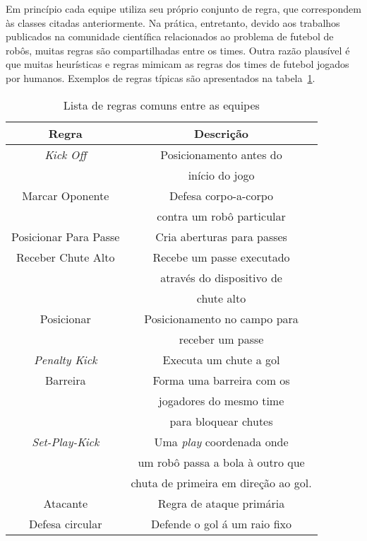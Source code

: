 Em princípio cada equipe utiliza seu próprio conjunto de regra, que correspondem
às classes citadas anteriormente.
Na prática, entretanto, devido aos trabalhos publicados na comunidade científica
relacionados ao problema de futebol de robôs, muitas regras são compartilhadas
entre os times. Outra razão plausível é que muitas heurísticas e regras mimicam
as regras dos times de futebol jogados por humanos. Exemplos de regras típicas são
apresentados na tabela~\ref{regras}.

\begin{table}
  \begin{center}
    \begin{tabular}{|c|c|}
      \hline
      Regra                  & Descrição \\
      \hline
      \textit{Kick Off}      & Posicionamento antes do\\
                             & início do jogo\\
      \hline
      Marcar Oponente        & Defesa corpo-a-corpo\\
                             & contra um robô particular\\
      \hline
      Posicionar Para Passe  & Cria aberturas para passes\\
      \hline
      Receber Chute Alto     & Recebe um passe executado\\
                             & através do dispositivo de\\
      & chute alto\\
      \hline
      Posicionar             & Posicionamento no campo para\\
                             & receber um passe\\
      \hline
      \textit{Penalty Kick}  & Executa um chute a gol\\
      \hline
      Barreira               & Forma uma barreira com os \\
                             & jogadores do mesmo time \\
                             & para bloquear chutes\\
      \hline
      \textit{Set-Play-Kick} & Uma \textit{play} coordenada onde\\
                             & um robô passa a bola à outro que \\
                             & chuta de primeira em direção ao gol.\\
      \hline
      Atacante               & Regra de ataque primária\\
      \hline
      Defesa circular        & Defende o gol á um raio fixo\\
      \hline
    \end{tabular}
  \caption{Lista de regras comuns entre as equipes}
  \label{regras}
  \end{center}
\end{table}

